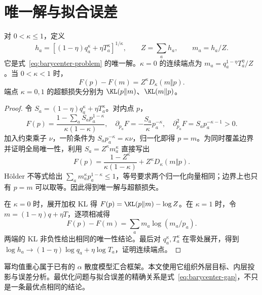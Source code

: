 \section{唯一解与拟合误差}
\begin{theorem}[归一化幂均值目标]
\label{thm:target}
对 $0<\kappa\le1$，定义
\begin{equation}
h_a=[(1-\eta)q_a^\kappa+\eta T_a^\kappa]^{1/\kappa},
\qquad Z=\sum_ah_a,\qquad m_a=h_a/Z.
\label{eq:target}
\end{equation}
它是式~\eqref{eq:barycenter-problem} 的唯一解。$\kappa=0$ 的连续端点为 $m_a=q_a^{1-\eta}T_a^\eta/Z$。当 $0<\kappa<1$ 时，
\begin{equation}
F(p)-F(m)=Z^\kappa D_\kappa(m\Vert p).
\label{eq:barycenter-gap}
\end{equation}
端点 $\kappa=0,1$ 的超额损失分别为 $\KL(p\Vert m)$、$\KL(m\Vert p)$。
\end{theorem}
\begin{proof}
令 $S_a=(1-\eta)q_a^\kappa+\eta T_a^\kappa$。对内点 $p$，
\begin{equation}
F(p)=\frac{1-\sum_aS_ap_a^{1-\kappa}}{\kappa(1-\kappa)},\quad
\partial_{p_a}F=-\frac{S_a}{\kappa}p_a^{-\kappa},\quad
\partial^2_{p_a}F=S_ap_a^{-\kappa-1}>0.
\end{equation}
加入约束乘子 $\nu$，一阶条件为 $S_ap_a^{-\kappa}=\kappa\nu$，归一化即得 $p=m$。为同时覆盖边界并证明全局唯一性，利用 $S_a=Z^\kappa m_a^\kappa$ 直接写出
\begin{equation}
F(p)=\frac{1-Z^\kappa}{\kappa(1-\kappa)}
+Z^\kappa D_\kappa(m\Vert p).
\end{equation}
Hölder 不等式给出 $\sum_am_a^\kappa p_a^{1-\kappa}\le1$，等号要求两个归一化向量相同；边界上也只有 $p=m$ 可以取等。因此得到唯一解与超额损失。

在 $\kappa=0$ 时，展开加权 KL 得 $F(p)=\KL(p\Vert m)-\log Z$。在 $\kappa=1$ 时，令 $m=(1-\eta)q+\eta T$，逐项相减得
\begin{equation}
F(p)-F(m)=\sum_am_a\log(m_a/p_a).
\end{equation}
两端的 KL 非负性给出相同的唯一性结论。最后对 $q_a^\kappa,T_a^\kappa$ 在零处展开，得到 $\log h_a\to(1-\eta)\log q_a+\eta\log T_a$，证明连续端点。
\end{proof}

幂均值重心属于已有的 $\alpha$ 散度模型汇合框架。本文使用它组织外层目标、内层投影与误差分析。最优化问题与拟合误差的精确关系是式~\eqref{eq:barycenter-gap}，不只是一条最优点相同的结论。

